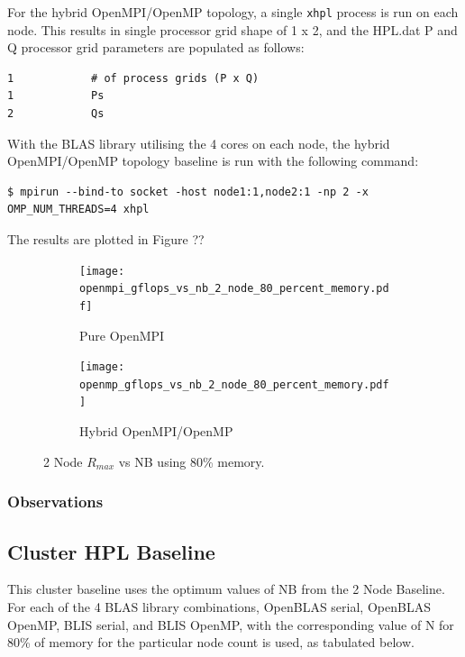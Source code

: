 \documentclass{report}
\begin{document}
For the hybrid OpenMPI/OpenMP topology, a single \verb|xhpl| process is run on each node. This results in single processor grid shape of 1 x 2, and the HPL.dat P and Q processor grid parameters are populated as follows:

\lstset{style=listing}
\begin{lstlisting}[numbers=none]
1            # of process grids (P x Q)
1            Ps
2            Qs
\end{lstlisting}

With the BLAS library utilising the 4 cores on each node, the hybrid OpenMPI/OpenMP topology baseline is run with the following command:

\lstset{style=type}
\begin{lstlisting}[]
$ mpirun --bind-to socket -host node1:1,node2:1 -np 2 -x OMP_NUM_THREADS=4 xhpl
\end{lstlisting}

The results are plotted in Figure ??

\begin{figure}[H]
	\begin{subfigure}{1.0\textwidth}
		\centering
		\texttt{[image: openmpi\_gflops\_vs\_nb\_2\_node\_80\_percent\_memory.pdf]}
		\caption{Pure OpenMPI}
		\label{fig:subim1}
	\end{subfigure}
	\par\bigskip
	\begin{subfigure}{1.0\textwidth}
		\centering
		\texttt{[image: openmp\_gflops\_vs\_nb\_2\_node\_80\_percent\_memory.pdf]}
		\caption{Hybrid OpenMPI/OpenMP}
		\label{fig:subim2}
	\end{subfigure}
\caption{2 Node $R_{max}$ vs NB using 80\% memory.}
\label{fig:image2}
\end{figure}



%
%
\subsubsection{Observations}




%
%
\subsection{Cluster HPL Baseline}

This cluster baseline uses the optimum values of NB from the 2 Node Baseline. For each of the 4 BLAS library combinations, OpenBLAS serial, OpenBLAS OpenMP, BLIS serial, and BLIS OpenMP, with the corresponding value of N for 80\% of memory for the particular node count is used, as tabulated below.
\end{document}
